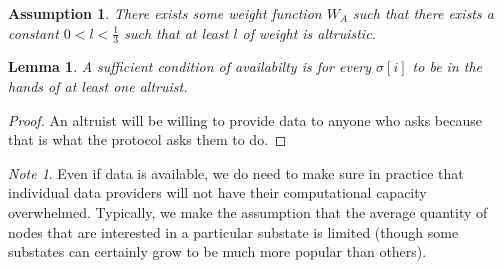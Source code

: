 \documentclass[11pt,a4paper]{report}
\theoremstyle{plain}
\newtheorem{lem}[thm]{Lemma}
\newtheorem{assm}{Assumption}[chapter]
\theoremstyle{definition}
\theoremstyle{remark}
\newtheorem*{note}{Note}
\begin{document}
\begin{assm}
There exists some weight function $W_A$ such that there exists a constant $0 < l < \frac{1}{3}$ such that at least $l$ of weight is altruistic.
\end{assm}

\begin{lem}
A sufficient condition of availabilty is for every $\sigma[i]$ to be in the hands of at least one altruist.
\end{lem}

\begin{proof}
An altruist will be willing to provide data to anyone who asks because that is what the protocol asks them to do.
\end{proof}

\begin{note}
Even if data is available, we do need to make sure in practice that individual data providers will not have their computational capacity overwhelmed. Typically, we make the assumption that the average quantity of nodes that are interested in a particular substate is limited (though some substates can certainly grow to be much more popular than others).
\end{note}
\end{document}
